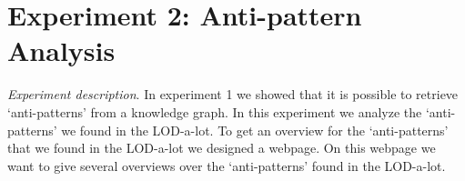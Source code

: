 \documentclass[11pt,letterpaper ,oneside ]{book}
\begin{document}
	\section{Experiment 2: Anti-pattern Analysis} %
	\textit{Experiment description}. In experiment 1 we showed that it is possible to retrieve `anti-patterns' from a knowledge graph. In this experiment we analyze the `anti-patterns' we found in the LOD-a-lot. To get an overview for the `anti-patterns' that we found in the LOD-a-lot we designed a webpage. On this webpage we want to give several overviews over the `anti-patterns' found in the LOD-a-lot.
	
	\begin{figure}[!t]
	\end{figure}
	
\end{document}
